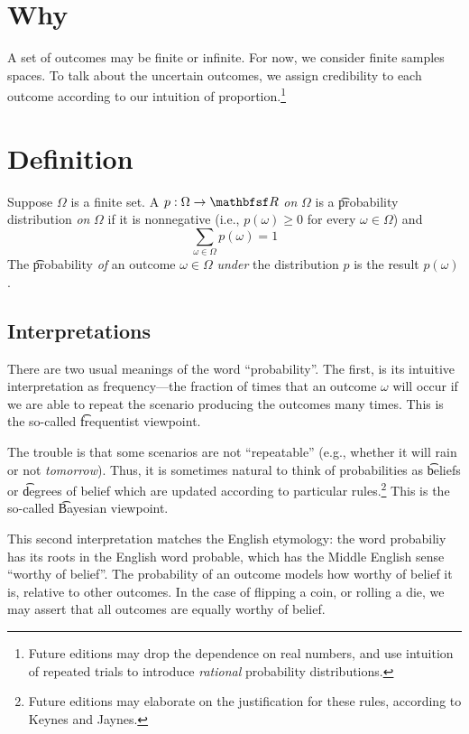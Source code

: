 
\section*{Why}

A set of outcomes may be finite or infinite.
For now, we consider finite samples spaces.
To talk about the uncertain outcomes, we assign credibility to each outcome according to our intuition of proportion.\footnote{Future editions may drop the dependence on real numbers, and use intuition of repeated trials to introduce \textit{rational} probability distributions.}

\section*{Definition}

Suppose $\Omega $ is a finite set.
A $p: \Omega  \to \R $ \textit{on} $\Omega $ is a \t{probability distribution} \textit{on} $\Omega $ if it is nonnegative (i.e., $p(\omega ) \geq 0$ for every $\omega  \in \Omega $) and
\[
\textstyle
\sum_{\omega  \in \Omega } p(\omega ) = 1
\]
The \t{probability} \textit{of} an outcome $\omega  \in \Omega $ \textit{under} the distribution $p$ is the result $p(\omega )$.

\subsection*{Interpretations}

There are two usual meanings of the word ``probability''.
The first, is its intuitive interpretation as frequency---the fraction of times that an outcome $\omega $ will occur if we are able to repeat the scenario producing the outcomes many times.
This is the so-called \t{frequentist} viewpoint.

The trouble is that some scenarios are not ``repeatable'' (e.g., whether it will rain or not \textit{tomorrow}).
Thus, it is sometimes natural to think of probabilities as \t{beliefs} or \t{degrees of belief} which are updated according to particular rules.\footnote{Future editions may elaborate on the justification for these rules, according to Keynes and Jaynes.}
This is the so-called \t{Bayesian viewpoint}.

This second interpretation matches the English etymology: the word probabiliy has its roots in the English word probable, which has the Middle English sense ``worthy of belief''.
The probability of an outcome models how worthy of belief it is, relative to other outcomes.
In the case of flipping a coin, or rolling a die, we may assert that all outcomes are equally worthy of belief.

